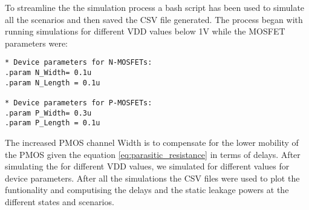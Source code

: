 To streamline the the simulation process a bash script has been used to simulate all the scenarios and then saved the CSV file generated. The process began with running simulations for different VDD values below 1V while the MOSFET parameters were:

\begin{lstlisting}
* Device parameters for N-MOSFETs:
.param N_Width= 0.1u
.param N_Length = 0.1u

* Device parameters for P-MOSFETs:
.param P_Width= 0.3u
.param P_Length = 0.1u
\end{lstlisting}

The increased PMOS channel Width is to compensate for the lower mobility of the PMOS given the equation \ref{eq:parasitic_resistance} in terms of delays. After simulating the for different VDD values, we simulated for different values for device parameters. After all the simulations the CSV files were used to plot the funtionality and computising the delays and the static leakage powers at the different states and scenarios. 